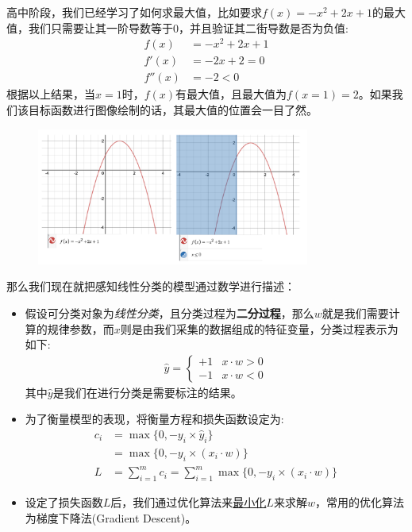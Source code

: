 \documentclass[12pt]{article}
\numberwithin{figure}{section}
\numberwithin{equation}{section}
\begin{document}
高中阶段，我们已经学习了如何求最大值，比如要求$f(x) = -x^2 + 2x + 1$的最大值，我们只需要让其一阶导数等于0，并且验证其二街导数是否为负值:
\begin{align*}
	f(x) & = -x^2 + 2x + 1 \\
	f'(x) & = -2x + 2 = 0 \\
	f''(x) & = -2 < 0 
\end{align*}
根据以上结果，当$x=1$时，$f(x)$有最大值，且最大值为$f(x=1) = 2$。如果我们该目标函数进行图像绘制的话，其最大值的位置会一目了然。
\begin{figure}[H]
	\centering
	\includegraphics[width=0.8\textwidth]{fig/C2C2optimizaE1}
\end{figure}

那么我们现在就把感知线性分类的模型通过数学进行描述：
\begin{itemize}
	\item 假设可分类对象为\textit{线性分类}，且分类过程为\textbf{二分过程}，那么$w$就是我们需要计算的规律参数，而$x$则是由我们采集的数据组成的特征变量，分类过程表示为如下:
	\begin{align*}
		\hat{y} = \begin{cases}
			+1 & x \cdot w > 0 \\
			-1 & x \cdot w < 0
		\end{cases}
	\end{align*}
	其中$\hat{y}$是我们在进行分类是需要标注的结果。
	\item 为了衡量模型的表现，将衡量方程和损失函数设定为:
	\begin{align*}
		c_i & = \max  \{ 0, - y_i \times \hat{y}_i \} \\
		  & = \max \{ 0, -y_i \times (x_i \cdot w) \}  \\
		L & = \sum_{i=1}^m c_i = \sum_{i=1}^m \max \{ 0, -y_i \times (x_i \cdot w) \} 
	\end{align*}
	\item 设定了损失函数$L$后，我们通过优化算法来\underline{最小化}$L$来求解$w$，常用的优化算法为梯度下降法(Gradient Descent)。
\end{itemize}
\end{document}
